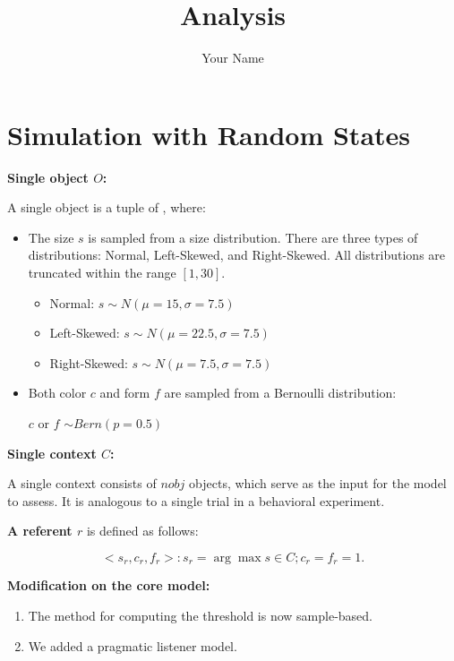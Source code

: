 \documentclass[
]{article}
\title{Analysis}
\author{Your Name}
\date{}
\providecommand{\tightlist}{%
  \setlength{\itemsep}{0pt}\setlength{\parskip}{0pt}}
\begin{document}
\maketitle

{
\setcounter{tocdepth}{2}
\tableofcontents
}
\hypertarget{simulation-with-random-states}{%
\section{Simulation with Random
States}\label{simulation-with-random-states}}

\textbf{Single object \(O\):}

A single object is a tuple of \(<s, c, f>\), where:

\begin{itemize}
\item
  The size \(s\) is sampled from a size distribution. There are three
  types of distributions: Normal, Left-Skewed, and Right-Skewed. All
  distributions are truncated within the range \([1, 30]\).

  \begin{itemize}
  \tightlist
  \item
    Normal: \(s \sim N(\mu = 15, \sigma = 7.5)\)
  \item
    Left-Skewed: \(s \sim N(\mu = 22.5, \sigma = 7.5)\)
  \item
    Right-Skewed: \(s \sim N(\mu = 7.5, \sigma = 7.5)\)
  \end{itemize}
\item
  Both color \(c\) and form \(f\) are sampled from a Bernoulli
  distribution:

  \(c\) or \(f\) \(\sim Bern(p = 0.5)\)
\end{itemize}

\textbf{Single context \(C\):}

A single context consists of \(nobj\) objects, which serve as the input
for the model to assess. It is analogous to a single trial in a
behavioral experiment.

\textbf{A referent \(r\)} is defined as follows:

\[
<s_r, c_r, f_r>: s_r = \arg\max s \in C; c_r = f_r = 1.
\]

\textbf{Modification on the core model:}

\begin{enumerate}
\def\labelenumi{\arabic{enumi}.}
\tightlist
\item
  The method for computing the threshold is now sample-based.
\item
  We added a pragmatic listener model.
\end{enumerate}
\end{document}
